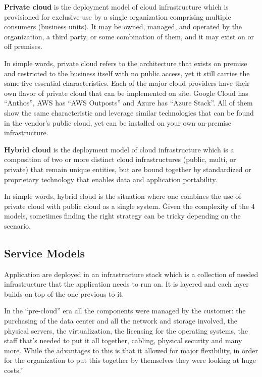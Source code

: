 \textbf{Private cloud} is the deployment model of cloud infrastructure which is provisioned for exclusive use by a
single organization comprising multiple consumers (business units). It may be owned, managed, and operated by the
organization, a third party, or some combination of them, and it may exist on or off premises.
\ed


In simple words, private cloud refers to the architecture that exists on premise and restricted to the business
itself with no public access, yet it still carries the same five essential characteristics. Each of the major cloud
providers have their own flavor of private cloud that can be implemented on site. Google Cloud has ``Anthos'', AWS
has ``AWS Outposts'' and Azure has ``Azure Stack''. All of them show the same characteristic and leverage similar
technologies that can be found in the vendor's public cloud, yet can be installed on your own on-premise infrastructure.

\textbf{Hybrid cloud} is the deployment model of cloud infrastructure which is a composition of two or more distinct
cloud infrastructures (public, multi, or private) that remain unique entities, but are bound together by standardized
or proprietary technology that enables data and application portability.
\ed


In simple words, hybrid cloud is the situation where one combines the use of private cloud with public cloud as a
single system. \v

Given the complexity of the 4 models, sometimes finding the right strategy can be tricky depending on the scenario.

\subsection{Service Models}

Application are deployed in an infrastructure stack which is a collection of needed infrastructure that the application
needs to run on. It is layered and each layer builds on top of the one previous to it.


In the ``pre-cloud'' era all the components were managed by the customer: the purchasing of the data center and all
the network and storage involved, the physical servers, the virtualization, the licensing for the operating systems,
the staff that's needed to put it all together, cabling, physical security and many more. While the advantages to
this is that it allowed for major flexibility, in order for the organization to put this together by themselves they
were looking at huge costs. \v


